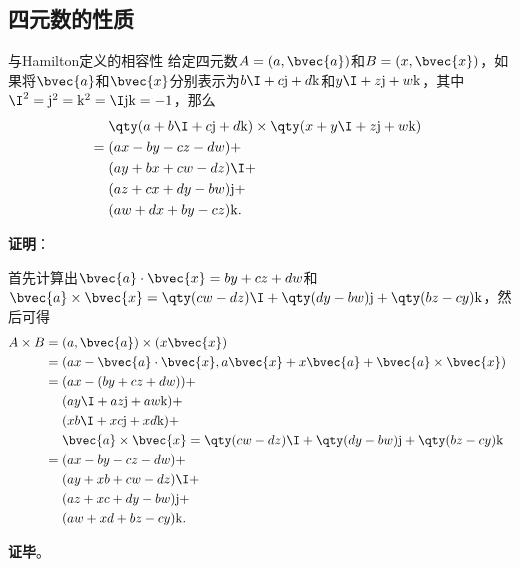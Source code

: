 \subsection{四元数的性质}



\begin{lemma}{与Hamilton定义的相容性}
给定四元数$A=(a, \bvec{a})$和$B=(x, \bvec{x})$，如果将$\bvec{a}$和$\bvec{x}$分别表示为$b\I+c\mathrm{j}+d\mathrm{k}$和$y\I+z\mathrm{j}+w\mathrm{k}$，其中$\I^2=\mathrm{j}^2=\mathrm{k}^2=\I\mathrm{j}\mathrm{k}=-1$，那么
\begin{equation}
    \begin{aligned}
        &\qty(a+b\I+c\mathrm{j}+d\mathrm{k})\times\qty(x+y\I+z\mathrm{j}+w\mathrm{k})\\
        ={}& (ax-by-cz-dw)+\\
        &(ay+bx+cw-dz)\I+\\
        &(az+cx+dy-bw)\mathrm{j}+\\
        &(aw+dx+by-cz)\mathrm{k}. 
    \end{aligned}~
\end{equation}
\end{lemma}


\textbf{证明}：

首先计算出$\bvec{a}\cdot\bvec{x}=by+cz+dw$和$\bvec{a}\times \bvec{x}=\qty(cw-dz)\I+\qty(dy-bw)\mathrm{j}+\qty(bz-cy)\mathrm{k}$，然后可得
\begin{equation}
\begin{aligned}
A\times B ={}& (a, \bvec{a})\times(x\bvec{x})\\
={}& (ax-\bvec{a}\cdot\bvec{x}, a\bvec{x}+x\bvec{a}+\bvec{a}\times\bvec{x})\\
={}& (ax-(by+cz+dw))+\\
   & (ay\I+az\mathrm{j}+aw\mathrm{k})+\\
   & (xb\I+xc\mathrm{j}+xd\mathrm{k})+\\
   & \bvec{a}\times \bvec{x}=\qty(cw-dz)\I+\qty(dy-bw)\mathrm{j}+\qty(bz-cy)\mathrm{k}\\
={}& (ax-by-cz-dw)+\\
   & (ay+xb+cw-dz)\I+\\
   & (az+xc+dy-bw)\mathrm{j}+\\
   & (aw+xd+bz-cy)\mathrm{k}. 
\end{aligned}~
\end{equation}


\textbf{证毕}。





